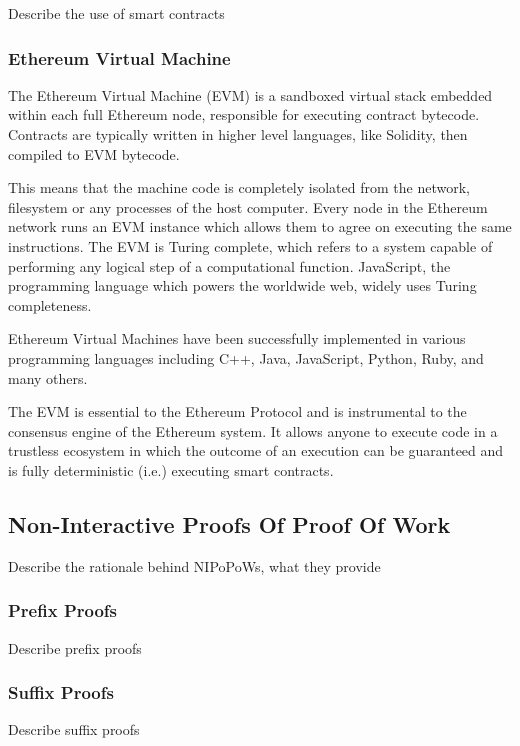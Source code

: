 \documentclass{article}
\begin{document}
  Describe the use of smart contracts

  \subsubsection{Ethereum Virtual Machine}

  The Ethereum Virtual Machine (EVM) is a sandboxed virtual stack
  embedded within each full Ethereum node, responsible for executing
  contract bytecode. Contracts are typically written in higher level
  languages, like Solidity, then compiled to EVM bytecode.

  This means that the machine code is completely isolated from the
  network, filesystem or any processes of the host computer. Every node
  in the Ethereum network runs an EVM instance which allows them to
  agree on executing the same instructions. The EVM is Turing complete,
  which refers to a system capable of performing any logical step of a
  computational function. JavaScript, the programming language which
  powers the worldwide web, widely uses Turing completeness.

  Ethereum Virtual Machines have been successfully implemented in
  various programming languages including C++, Java, JavaScript, Python,
  Ruby, and many others.

  The EVM is essential to the Ethereum Protocol and is instrumental to
  the consensus engine of the Ethereum system. It allows anyone to
  execute code in a trustless ecosystem in which the outcome of an
  execution can be guaranteed and is fully deterministic (i.e.)
  executing smart contracts.

  \subsection{Non-Interactive Proofs Of Proof Of Work}

  Describe the rationale behind NIPoPoWs, what they provide

  \subsubsection{Prefix Proofs}

  Describe prefix proofs

  \subsubsection{Suffix Proofs}

  Describe suffix proofs
\end{document}
